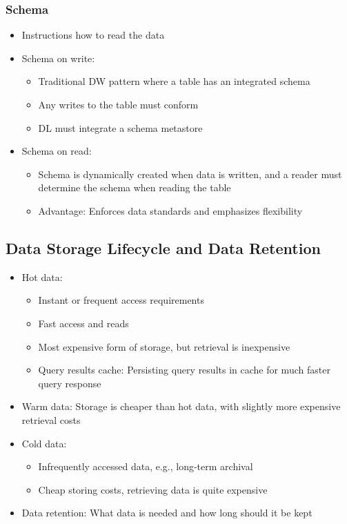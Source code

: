 \documentclass[11pt]{scrartcl}
\begin{document}
\subsubsection*{Schema}
\begin{itemize}
	\item Instructions how to read the data
	\item Schema on write:
	\begin{itemize}
		\item Traditional DW pattern where a table has an integrated schema 
		\item Any writes to the table must conform
		\item DL must integrate a schema metastore
	\end{itemize}
	\item Schema on read:
	\begin{itemize}
		\item Schema is dynamically created when data is written, and a reader must determine the schema when reading the table
		\item Advantage: Enforces data standards and emphasizes flexibility
	\end{itemize}
\end{itemize}


\subsection*{Data Storage Lifecycle and Data Retention}
\begin{itemize}
	\item Hot data:
	\begin{itemize}
		\item Instant or frequent access requirements
		\item Fast access and reads
		\item Most expensive form of storage, but retrieval is inexpensive
		\item Query results cache: Persisting query results in cache for much faster query response
	\end{itemize}
	\item Warm data: Storage is cheaper than hot data, with slightly more expensive retrieval costs
	\item Cold data:
	\begin{itemize}
		\item Infrequently accessed data, e.g., long-term archival
		\item Cheap storing costs, retrieving data is quite expensive
	\end{itemize}
	\item Data retention: What data is needed and how long should it be kept
\end{itemize}
\end{document}

